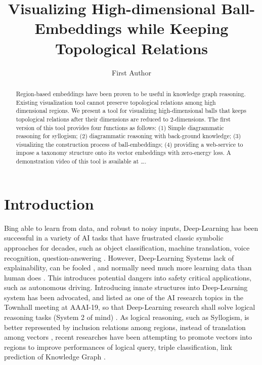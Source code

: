\documentclass[]{article}
\title{Visualizing High-dimensional Ball-Embeddings
	while Keeping Topological Relations}
\author{First Author}
\begin{document}
\maketitle

\begin{abstract}
	Region-based embeddings have been proven to be useful in knowledge graph reasoning. Existing visualization tool cannot preserve topological relations among high dimensional regions. We present a tool for visualizing high-dimensional balls that keeps topological relations after their dimensions are reduced to 2-dimensions. The first version of this tool provides four functions as follows: (1) Simple diagrammatic reasoning for syllogism; (2) diagrammatic reasoning with back-ground knowledge; (3) visualizing the construction process of ball-embeddings; (4) providing a web-service to impose a taxonomy structure onto its vector embeddings with zero-energy loss. A demonstration video of this tool is available at \dots. 
	
\end{abstract}
%
%
%
\section{Introduction}

Bing able to learn from data, and robust to noisy inputs, Deep-Learning has been successful in a variety of AI tasks that have frustrated classic symbolic approaches for decades, such as object classification, machine translation, voice recognition, question-answering \cite{LeCunNature15}. However, Deep-Learning  Systems lack of explainability, can be fooled \cite{BiDAF16,JiaLiangaL17,Belinkov17}, and normally need much more learning data than human does \cite{tenenbaum15}. This introduces potential dangers into safety critical applications, such as autonomous driving. Introducing innate structures into Deep-Learning system has been advocated, and listed as one of the AI research topics in the Townhall meeting at AAAI-19, so that Deep-Learning research shall solve logical reasoning tasks (System 2 of mind) \cite{Kahneman11,benjio19}. As logical reasoning, such as Syllogism, is better represented by inclusion relations among regions, instead of translation among vectors \cite{Venn1880,diagram95}, recent researches have been attempting to promote vectors into regions to improve performances of logical query, triple classification, link prediction of Knowledge Graph \cite{dong19iclr,dong19,li2019smoothing,JuanziEmnlp18,ren2020}.   
\end{document}

